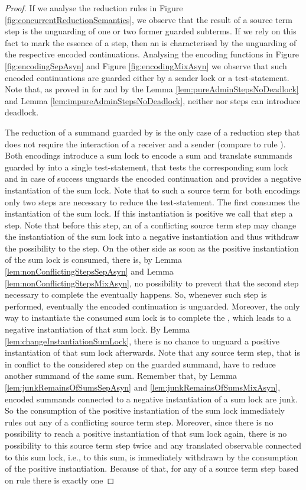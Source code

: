 \documentclass[]{llncs}
\begin{document}
\begin{proof}
	If we analyse the reduction rules in Figure \ref{fig:concurrentReductionSemantics}, we observe that the result of a source term step is the unguarding of one or two former guarded subterms. If we rely on this fact to mark the essence of a step, then an \simulation is characterised by the unguarding of the respective encoded continuations. Analysing the encoding functions in Figure \ref{fig:encodingSepAsyn} and Figure \ref{fig:encodingMixAsyn} we observe that such encoded continuations are guarded either by a sender lock or a test-statement. Note that, as proved in \cite{nestmann00} for  and by the Lemma \ref{lem:pureAdminStepsNoDeadlock} and Lemma \ref{lem:impureAdminStepsNoDeadlock}, neither \pure nor \impure \admin steps can introduce deadlock.
	
	The reduction of a summand guarded by  is the only case of a reduction step that does not require the interaction of a receiver and a sender (compare to rule ). Both encodings introduce a sum lock to encode a sum and translate summands guarded by  into a single test-statement, that tests the corresponding sum lock and in case of success unguards the encoded continuation and provides a negative instantiation of the sum lock. Note that to \simulate such a source term for both encodings only two steps are necessary to reduce the test-statement. The first consumes the instantiation of the sum lock. If this instantiation is positive we call that step a \nonAdmin step. Note that before this step, an \simulation of a conflicting source term step may change the instantiation of the sum lock into a negative instantiation and thus withdraw the possibility to \simulate the step. On the other side as soon as the positive instantiation of the sum lock is consumed, there is, by Lemma \ref{lem:nonConflictingStepsSepAsyn} and Lemma \ref{lem:nonConflictingStepsMixAsyn}, no possibility to prevent that the second step necessary to complete the \simulation eventually happens. So, whenever such \nonAdmin step is performed, eventually the encoded continuation is unguarded. Moreover, the only way to instantiate the consumed sum lock is to complete the \simulation, which leads to a negative instantiation of that sum lock. By Lemma \ref{lem:changeInstantiationSumLock}, there is no chance to unguard a positive instantiation of that sum lock afterwards. Note that any source term step, that is in conflict to the considered step on the  guarded summand, have to reduce another summand of the same sum. Remember that, by Lemma \ref{lem:junkRemainsOfSumsSepAsyn} and \ref{lem:junkRemainsOfSumsMixAsyn}, encoded summands connected to a negative instantiation of a sum lock are junk. So the consumption of the positive instantiation of the sum lock immediately rules out any \simulation of a conflicting source term step. Moreover, since there is no possibility to reach a positive instantiation of that sum lock again, there is no possibility to \simulate this source term step twice and any translated observable connected to this sum lock, i.e., to this sum, is immediately withdrawn by the consumption of the positive instantiation. Because of that, for any \simulation of a source term step based on rule  there is exactly one 
\end{proof}
\end{document}
